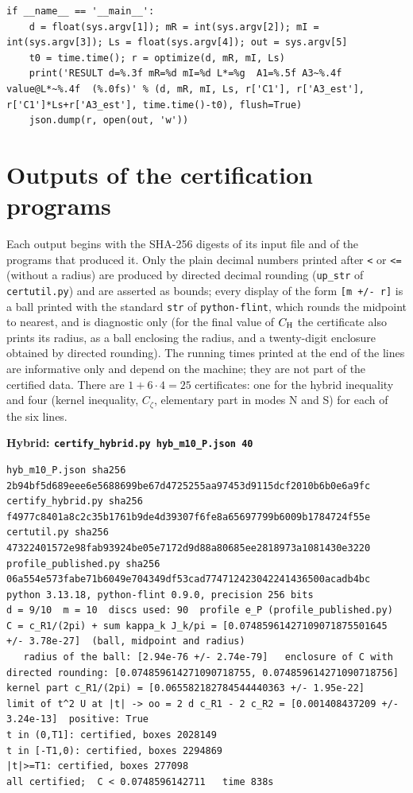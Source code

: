 \documentclass[11pt,reqno]{amsart}
\numberwithin{equation}{section}
\theoremstyle{definition}
\theoremstyle{remark}
\newcommand{\appsub}[1]{\par\medskip\noindent\textbf{#1}\par\nobreak\smallskip}
\begin{document}
\begin{lstlisting}
if __name__ == '__main__':
    d = float(sys.argv[1]); mR = int(sys.argv[2]); mI = int(sys.argv[3]); Ls = float(sys.argv[4]); out = sys.argv[5]
    t0 = time.time(); r = optimize(d, mR, mI, Ls)
    print('RESULT d=%.3f mR=%d mI=%d L*=%g  A1=%.5f A3~%.4f  value@L*~%.4f  (%.0fs)' % (d, mR, mI, Ls, r['C1'], r['A3_est'], r['C1']*Ls+r['A3_est'], time.time()-t0), flush=True)
    json.dump(r, open(out, 'w'))
\end{lstlisting}
\clearpage
\section{Outputs of the certification programs}\label{app:cert}
Each output begins with the SHA-256 digests of its input file and of the programs that produced it. Only the plain decimal numbers printed after \texttt{<} or \texttt{<=} (without a radius) are produced by directed decimal rounding (\texttt{up\_str} of \texttt{certutil.py}) and are asserted as bounds; every display of the form \texttt{[m +/- r]} is a ball printed with the standard \texttt{str} of \texttt{python-flint}, which rounds the midpoint to nearest, and is diagnostic only (for the final value of $C_{\rm H}$ the certificate also prints its radius, as a ball enclosing the radius, and a twenty-digit enclosure obtained by directed rounding). The running times printed at the end of the lines are informative only and depend on the machine; they are not part of the certified data. There are $1+6\cdot4=25$ certificates: one for the hybrid inequality and four (kernel inequality, $C_\zeta$, elementary part in modes N and S) for each of the six lines.
\appsub{Hybrid: \texttt{certify\_hybrid.py hyb\_m10\_P.json 40}}
\label{app:out_hybrid}
\begin{lstlisting}
hyb_m10_P.json sha256 2b94bf5d689eee6e5688699be67d4725255aa97453d9115dcf2010b6b0e6a9fc
certify_hybrid.py sha256 f4977c8401a8c2c35b1761b9de4d39307f6fe8a65697799b6009b1784724f55e
certutil.py sha256 47322401572e98fab93924be05e7172d9d88a80685ee2818973a1081430e3220
profile_published.py sha256 06a554e573fabe71b6049e704349df53cad774712423042241436500acadb4bc
python 3.13.18, python-flint 0.9.0, precision 256 bits
d = 9/10  m = 10  discs used: 90  profile e_P (profile_published.py)
C = c_R1/(2pi) + sum kappa_k J_k/pi = [0.07485961427109071875501645 +/- 3.78e-27]  (ball, midpoint and radius)
   radius of the ball: [2.94e-76 +/- 2.74e-79]   enclosure of C with directed rounding: [0.074859614271090718755, 0.074859614271090718756]
kernel part c_R1/(2pi) = [0.065582182784544440363 +/- 1.95e-22]
limit of t^2 U at |t| -> oo = 2 d c_R1 - 2 c_R2 = [0.001408437209 +/- 3.24e-13]  positive: True
t in (0,T1]: certified, boxes 2028149
t in [-T1,0): certified, boxes 2294869
|t|>=T1: certified, boxes 277098
all certified;  C < 0.0748596142711   time 838s
\end{lstlisting}
\end{document}
